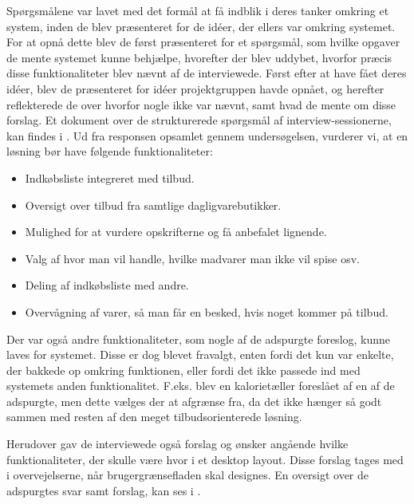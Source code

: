 Spørgsmålene var lavet med det formål at få indblik i deres tanker omkring et system, inden de blev præsenteret for de idéer, der ellers var omkring systemet.
For at opnå dette blev de først præsenteret for et spørgsmål, som hvilke opgaver de mente systemet kunne behjælpe, hvorefter der blev uddybet, hvorfor præcis disse funktionaliteter blev nævnt af de interviewede.
Først efter at have fået deres idéer, blev de præsenteret for idéer projektgruppen havde opnået, og herefter reflekterede de over hvorfor nogle ikke var nævnt, samt hvad de mente om disse forslag.
Et dokument over de strukturerede spørgsmål af interview-sessionerne, kan findes i .
Ud fra responsen opsamlet gennem undersøgelsen, vurderer vi, at en løsning bør have følgende funktionaliteter:

\begin{itemize}[nolistsep,noitemsep]
	\item Indkøbsliste integreret med tilbud.
	\item Oversigt over tilbud fra samtlige dagligvarebutikker.
	\item Mulighed for at vurdere opskrifterne og få anbefalet lignende.
	\item Valg af hvor man vil handle, hvilke madvarer man ikke vil spise osv.
	\item Deling af indkøbsliste med andre.
	\item Overvågning af varer, så man får en besked, hvis noget kommer på tilbud.
\end{itemize}

Der var også andre funktionaliteter, som nogle af de adspurgte foreslog, kunne laves for systemet.
Disse er dog blevet fravalgt, enten fordi det kun var enkelte, der bakkede op omkring funktionen, eller fordi det ikke passede ind med systemets anden funktionalitet.
F.eks. blev en kalorietæller foreslået af en af de adspurgte, men dette vælges der at afgrænse fra, da det ikke hænger så godt sammen med resten af den meget tilbudsorienterede løsning.

Herudover gav de interviewede også forslag og ønsker angående hvilke funktionaliteter, der skulle være hvor i et desktop layout.
Disse forslag tages med i overvejelserne, når brugergrænsefladen skal designes.
En oversigt over de adspurgtes svar samt forslag, kan ses i .
